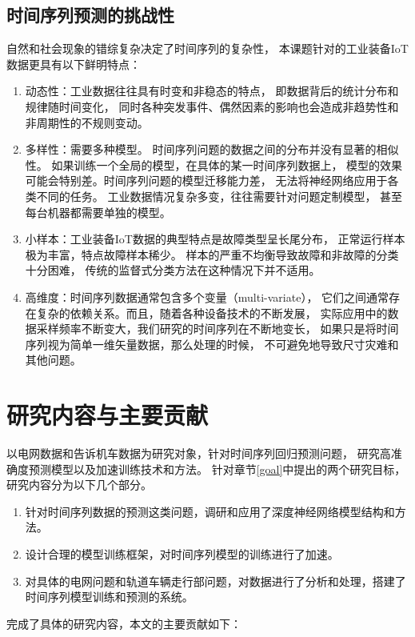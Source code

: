   \subsection{时间序列预测的挑战性}
    自然和社会现象的错综复杂决定了时间序列的复杂性，
    本课题针对的工业装备IoT数据更具有以下鲜明特点：
    \begin{enumerate}[(1)]
      \item 动态性：工业数据往往具有时变和非稳态的特点，
      即数据背后的统计分布和规律随时间变化，
      同时各种突发事件、偶然因素的影响也会造成非趋势性和非周期性的不规则变动。
      \item 多样性：需要多种模型。
      时间序列问题的数据之间的分布并没有显著的相似性。
      如果训练一个全局的模型，在具体的某一时间序列数据上，
      模型的效果可能会特别差。时间序列问题的模型迁移能力差，
      无法将神经网络应用于各类不同的任务。
      工业数据情况复杂多变，往往需要针对问题定制模型，
      甚至每台机器都需要单独的模型。
      \item 小样本：工业装备IoT数据的典型特点是故障类型呈长尾分布，
      正常运行样本极为丰富，特点故障样本稀少。
      样本的严重不均衡导致故障和非故障的分类十分困难，
      传统的监督式分类方法在这种情况下并不适用。
      \item 高维度：时间序列数据通常包含多个变量（multi-variate），
      它们之间通常存在复杂的依赖关系。而且，随着各种设备技术的不断发展，
      实际应用中的数据采样频率不断变大，我们研究的时间序列在不断地变长，
      如果只是将时间序列视为简单一维矢量数据，那么处理的时候，
      不可避免地导致尺寸灾难和其他问题。
    \end{enumerate}

\section{研究内容与主要贡献}
以电网数据和告诉机车数据为研究对象，针对时间序列回归预测问题，
研究高准确度预测模型以及加速训练技术和方法。
针对章节\ref{goal}中提出的两个研究目标，研究内容分为以下几个部分。
\begin{enumerate}[(1)]
  \item 针对时间序列数据的预测这类问题，调研和应用了深度神经网络模型结构和方法。
  \item 设计合理的模型训练框架，对时间序列模型的训练进行了加速。
  \item 对具体的电网问题和轨道车辆走行部问题，对数据进行了分析和处理，搭建了时间序列模型训练和预测的系统。
\end{enumerate}

完成了具体的研究内容，本文的主要贡献如下：

